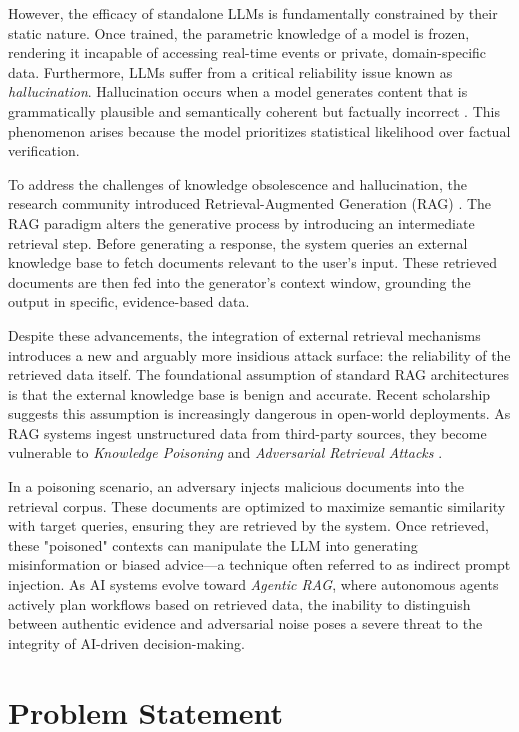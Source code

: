 However, the efficacy of standalone LLMs is fundamentally constrained by their static nature. Once trained, the parametric knowledge of a model is frozen, rendering it incapable of accessing real-time events or private, domain-specific data. Furthermore, LLMs suffer from a critical reliability issue known as \textit{hallucination}. Hallucination occurs when a model generates content that is grammatically plausible and semantically coherent but factually incorrect \parencite{ji2023survey}. This phenomenon arises because the model prioritizes statistical likelihood over factual verification.

To address the challenges of knowledge obsolescence and hallucination, the research community introduced Retrieval-Augmented Generation (RAG) \parencite{lewis2020rag}. The RAG paradigm alters the generative process by introducing an intermediate retrieval step. Before generating a response, the system queries an external knowledge base to fetch documents relevant to the user’s input. These retrieved documents are then fed into the generator’s context window, grounding the output in specific, evidence-based data.

Despite these advancements, the integration of external retrieval mechanisms introduces a new and arguably more insidious attack surface: the reliability of the retrieved data itself. The foundational assumption of standard RAG architectures is that the external knowledge base is benign and accurate. Recent scholarship suggests this assumption is increasingly dangerous in open-world deployments. As RAG systems ingest unstructured data from third-party sources, they become vulnerable to \textit{Knowledge Poisoning} and \textit{Adversarial Retrieval Attacks} \parencite{zou2024poisoned}.

In a poisoning scenario, an adversary injects malicious documents into the retrieval corpus. These documents are optimized to maximize semantic similarity with target queries, ensuring they are retrieved by the system. Once retrieved, these "poisoned" contexts can manipulate the LLM into generating misinformation or biased advice—a technique often referred to as indirect prompt injection. As AI systems evolve toward \textit{Agentic RAG}, where autonomous agents actively plan workflows based on retrieved data, the inability to distinguish between authentic evidence and adversarial noise poses a severe threat to the integrity of AI-driven decision-making.

\section{Problem Statement}
\label{sec:problem_statement}

